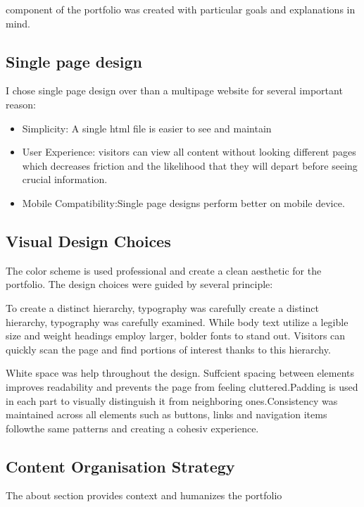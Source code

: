 \documentclass[12pt,a4paper]{article}
\begin{document}
component of the portfolio was created with particular goals and explanations in mind.

\subsection{Single page design}

I chose single page design over than a multipage website for several important reason:

\begin{itemize}
    \item Simplicity: A single html file is easier to see and maintain
    \item User Experience: visitors can view all content without looking different pages which decreases friction and the likelihood that they will depart before seeing crucial information.
    \item Mobile Compatibility:Single page designs perform better on mobile device.
\end{itemize}

\subsection{Visual Design Choices}

The color scheme is used professional and create a clean aesthetic for the portfolio. The design choices were guided by several principle:

To create a distinct hierarchy, typography was carefully create a distinct hierarchy, typography was carefully examined. While body text utilize a legible size and weight headings employ larger, bolder fonts to stand out. Visitors can quickly scan the page and find portions of interest thanks to this hierarchy.

White space was help throughout the design. Suffcient spacing between elements improves readability and prevents the page from feeling cluttered.Padding is used in each part to visually distinguish it from neighboring ones.Consistency was maintained across all elements such as buttons, links and navigation items followthe same patterns and creating a cohesiv experience.


\subsection{Content Organisation Strategy}

The about section provides context and humanizes the portfolio 
\end{document}
